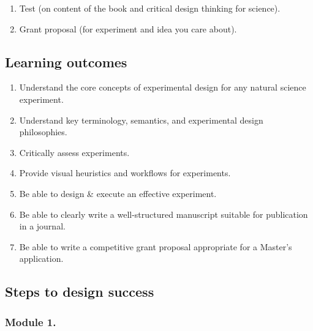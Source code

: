 \documentclass[
]{book}
\providecommand{\tightlist}{%
  \setlength{\itemsep}{0pt}\setlength{\parskip}{0pt}}
\begin{document}
\begin{enumerate}
\def\labelenumi{\arabic{enumi}.}
\tightlist
\item
  Test (on content of the book and critical design thinking for science).\\
\item
  Grant proposal (for experiment and idea you care about).
\end{enumerate}

\hypertarget{learning-outcomes}{%
\subsection*{Learning outcomes}\label{learning-outcomes}}

\begin{enumerate}
\def\labelenumi{\arabic{enumi}.}
\tightlist
\item
  Understand the core concepts of experimental design for any natural science experiment.\\
\item
  Understand key terminology, semantics, and experimental design philosophies.\\
\item
  Critically assess experiments.\\
\item
  Provide visual heuristics and workflows for experiments.\\
\item
  Be able to design \& execute an effective experiment.\\
\item
  Be able to clearly write a well-structured manuscript suitable for publication in a journal.\\
\item
  Be able to write a competitive grant proposal appropriate for a Master's application.
\end{enumerate}

\hypertarget{steps-to-design-success}{%
\subsection*{Steps to design success}\label{steps-to-design-success}}

\hypertarget{module-1.}{%
\subsubsection*{Module 1.}\label{module-1.}}
\end{document}
